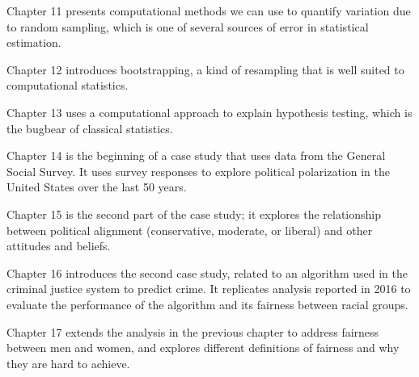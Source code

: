 \begin{description}
\item Chapter 11 presents computational methods we can
use to quantify variation due to random sampling, which is one of
several sources of error in statistical estimation.

\item Chapter 12 introduces bootstrapping, a kind of resampling that is
well suited to computational statistics.

\item Chapter 13 uses a computational approach to explain hypothesis testing, which is the bugbear of classical statistics.

\item Chapter 14 is the beginning of a case study that uses data from the General Social Survey. It uses survey responses to explore political polarization in the United States over the last 50 years.

\item Chapter 15 is the second part of the case study; it explores the relationship between political alignment (conservative, moderate, or liberal) and other attitudes and beliefs.

\item Chapter 16 introduces the second case study, related to an algorithm used in the criminal justice system to predict crime. It replicates analysis reported in 2016 to evaluate the performance of the algorithm and its fairness between racial groups.

\item Chapter 17 extends the analysis in the previous chapter to address fairness between men and women, and explores different definitions of fairness and why they are hard to achieve.

\end{description}
